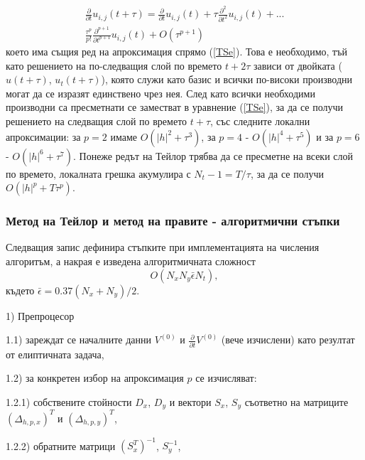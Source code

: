 \documentclass[a4paper]{article}
\newcommand{\rf}[1]{(\ref{#1})}
\theoremstyle{remark}
\begin{document}
\begin{align} \label{TSeDer}
\frac{ \partial}{ \partial t }u_{i,j}(t+\tau) = \frac{ \partial }{ \partial t }u_{i,j}(t) + \tau \frac{ \partial^2 }{ \partial t^2 }u_{i,j}(t)  + ... 
\nonumber\\
\frac{ \tau^p }{ p! } \frac{ \partial^{p+1}}{ \partial t^{p+1} }u_{i,j}(t) + O(\tau^{p+1})
\end{align}
което има същия ред на апроксимация спрямо \rf{TSe}. Това е необходимо, тъй като решението на по-следващия слой по времето $t+2\tau$ зависи от двойката ($u(t+\tau)$, $u_t(t+\tau)$), която служи като базис и всички по-високи производни могат да се изразят единствено чрез нея. След като всички необходими производни са пресметнати се заместват в уравнение \rf{TSe}, за да се получи решението на следващия слой по времето $t+\tau$, със следните локални апроксимации: за $p=2$ имаме $O(|h|^2 + \tau^3)$, за $p=4$ - $O(|h|^4 + \tau^5)$ и за $p=6$ - $O(|h|^6 + \tau^7)$. Понеже редът на Тейлор трябва да се пресметне на всеки слой по времето, локалната грешка акумулира с $N_t - 1 = T/\tau$, за да се получи $O(|h|^p + T \tau^p)$.

\subsubsection{Метод на Тейлор и метод на правите - алгоритмични стъпки}

Следващия запис дефинира стъпките при имплементацията на числения алгоритъм, а накрая е изведена алгоритмичната сложност
$$ O(N_x N_y \bar \epsilon N_t ), $$
където $\bar\epsilon = 0.37(N_x + N_y)/2$.
\par
1) Препроцесор
\par
1.1) зареждат се началните данни $V^{(0)}$ и $\frac{\partial}{\partial t} V^{(0)}$ (вече изчислени) като резултат от елиптичната задача,
\par
1.2) за конкретен избор на апроксимация $p$ се изчисляват:
\par
1.2.1) собствените стойности $D_x$, $D_y$ и вектори $S_x$, $S_y$ съответно на матриците $(\Delta_{h,p,x})^T$ и $(\Delta_{h,p,y})^T$, 
\par
1.2.2) обратните матрици $(S_x^T)^{-1}$, $S_y^{-1}$,
\\
\end{document}
